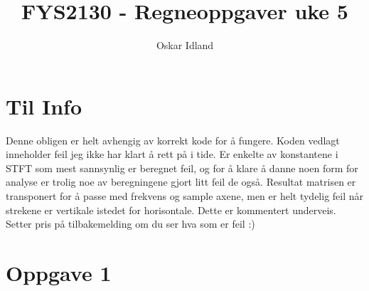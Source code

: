 \documentclass{article}
\author{Oskar Idland}
\title{FYS2130 - Regneoppgaver uke 5}
\date{}
\begin{document}
\maketitle
\newpage

\section*{Til Info}
  Denne obligen er helt avhengig av korrekt kode for å fungere. Koden vedlagt inneholder feil jeg ikke har klart å rett på i tide. Er enkelte av konstantene i STFT som mest sannsynlig er beregnet feil, og for å klare å danne noen form for analyse er trolig noe av beregningene gjort litt feil de også. Resultat matrisen er transponert for å passe med frekvens og sample axene, men er helt tydelig feil når strekene er vertikale istedet for horisontale. Dette er kommentert underveis. Setter pris på tilbakemelding om du ser hva som er feil :)

\section*{Oppgave 1}
\end{document}
